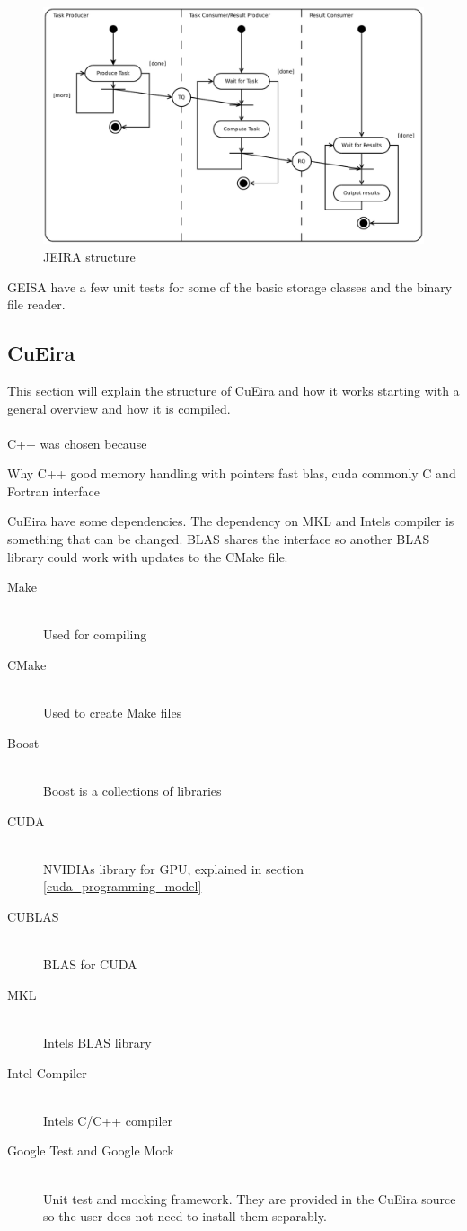 \documentclass[10pt,a4paper]{report}
\begin{document}
\begin{figure}[h]
    \centering
    \includegraphics[width=12cm]{jeira_structure.png}
    \caption{JEIRA structure}
    \label{fig:jeira_structure}
\end{figure}

GEISA have a few unit tests for some of the basic storage classes and the binary file reader.\\

\subsection{CuEira}
\label{cueira}
This section will explain the structure of CuEira and how it works starting with a general overview and how it is compiled.\\
\\
C++ was chosen because 

Why C++
good memory handling with pointers
fast
blas, cuda commonly C and Fortran interface

CuEira have some dependencies. The dependency on MKL and Intels compiler is something that can be changed. BLAS shares the interface so another BLAS library could work with updates to the CMake file.
\begin{description}
  \item[Make] \hfill \\
  Used for compiling
  \item[CMake] \hfill \\
  Used to create Make files
  \item[Boost] \hfill \\
  Boost is a collections of libraries
  \item[CUDA] \hfill \\
  NVIDIAs library for GPU, explained in section \ref{cuda_programming_model}
  \item[CUBLAS] \hfill \\
  BLAS for CUDA
  \item[MKL] \hfill \\
  Intels BLAS library
  \item[Intel Compiler] \hfill \\
  Intels C/C++ compiler
  \item[Google Test and Google Mock] \hfill \\
  Unit test and mocking framework. They are provided in the CuEira source so the user does not need to install them separably.
\end{description}
\end{document}
